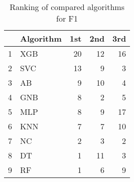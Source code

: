 \begin{table}
\footnotesize
\caption{Ranking of compared algorithms for F1}
\label{tab:places F1}
\begin{tabular}{llrrr}
\hline
 & Algorithm & 1st & 2nd & 3rd \\
\hline
1 & XGB & 20 & 12 & 16 \\
2 & SVC & 13 & 9 & 3 \\
3 & AB & 9 & 10 & 4 \\
4 & GNB & 8 & 2 & 5 \\
5 & MLP & 8 & 9 & 17 \\
6 & KNN & 7 & 7 & 10 \\
7 & NC & 2 & 3 & 2 \\
8 & DT & 1 & 11 & 3 \\
9 & RF & 1 & 6 & 9 \\
\hline
\end{tabular}
\end{table}
